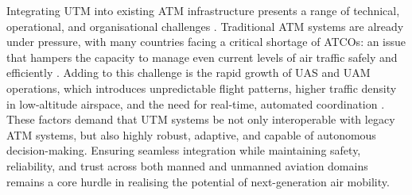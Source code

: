 Integrating \gls{UTM} into existing \gls{ATM} infrastructure presents a range of technical, operational, and organisational challenges \cite{Singh_2024}.
Traditional \gls{ATM} systems are already under pressure, with many countries facing a critical shortage of \glspl{ATCO}: an issue that hampers the capacity to manage even current levels of air traffic safely and efficiently \cite{eurocontrol2024digitalisation}.
Adding to this challenge is the rapid growth of \gls{UAS} and \gls{UAM} operations, which introduces unpredictable flight patterns, higher traffic density in low-altitude airspace, and the need for real-time, automated coordination \cite{Ramachandran_2025}.
These factors demand that \gls{UTM} systems be not only interoperable with legacy \gls{ATM} systems, but also highly robust, adaptive, and capable of autonomous decision-making.
Ensuring seamless integration while maintaining safety, reliability, and trust across both manned and unmanned aviation domains remains a core hurdle in realising the potential of next-generation air mobility.
